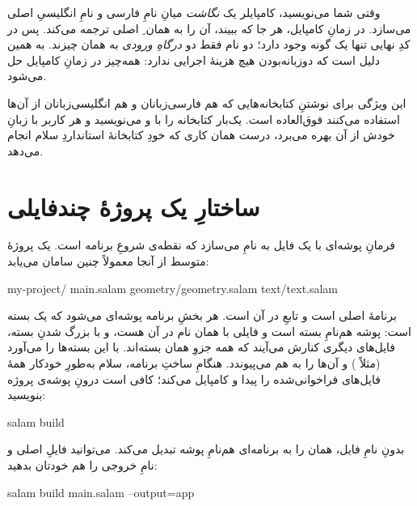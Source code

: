 \begin{deep}
وقتی شما  می‌نویسید، کامپایلر یک \emph{نگاشت} میانِ نامِ فارسی
و نامِ انگلیسیِ اصلی می‌سازد. در زمانِ کامپایل، هر جا که  ببیند، آن
را به همان ِ اصلی ترجمه می‌کند. پس در کدِ نهایی تنها یک گونه وجود
دارد؛ دو نام فقط دو \emph{درگاهِ ورودی} به همان چیزند. به همین دلیل است که
دوزبانه‌بودن هیچ هزینهٔ اجرایی ندارد: همه‌چیز در زمانِ کامپایل حل می‌شود.
\end{deep}

\begin{tip}
این ویژگی برای نوشتنِ کتابخانه‌هایی که هم فارسی‌زبانان و هم انگلیسی‌زبانان از
آن‌ها استفاده می‌کنند فوق‌العاده است. یک‌بار کتابخانه را با  و
 می‌نویسید و هر کاربر با زبانِ خودش از آن بهره می‌برد، درست همان
کاری که خودِ کتابخانهٔ استانداردِ سلام انجام می‌دهد.
\end{tip}

\section{ساختارِ یک پروژهٔ چندفایلی}

فرمانِ  پوشه‌ای با یک فایل به نامِ
 می‌سازد که نقطه‌ی شروعِ برنامه است. یک پروژهٔ متوسط از آنجا
معمولاً چنین سامان می‌یابد:

\begin{shell}
my-project/
    main.salam
    geometry/geometry.salam
    text/text.salam
\end{shell}

 برنامهٔ اصلی است و تابعِ  در آن است. هر بخشِ
برنامه پوشه‌ای می‌شود که یک بسته است: پوشه هم‌نامِ بسته است و فایلی با همان نام
در آن هست، و با بزرگ شدنِ بسته، فایل‌های دیگری کنارش می‌آیند که همه جزوِ همان
بسته‌اند.  با  این بسته‌ها را می‌آورد (مثلاً
) و آن‌ها را به هم می‌پیوندد.
هنگامِ ساختِ برنامه، سلام به‌طورِ خودکار همهٔ فایل‌های فراخوانی‌شده را پیدا و
کامپایل می‌کند؛ کافی است درونِ پوشه‌ی پروژه بنویسید:

\begin{shell}
salam build
\end{shell}

بدونِ نامِ فایل،  همان  را به برنامه‌ای
هم‌نامِ پوشه تبدیل می‌کند. می‌توانید فایلِ اصلی و نامِ خروجی را هم خودتان بدهید:

\begin{shell}
salam build main.salam --output=app
\end{shell}


